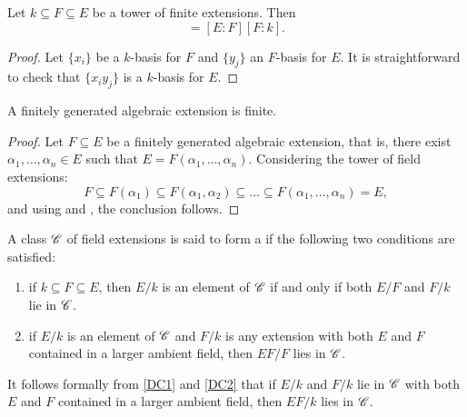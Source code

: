 \begin{proposition}
    Let $k\subseteq F\subseteq E$ be a tower of finite extensions. Then 
    \begin{equation*}
        [E : k] = [E : F][F : k].
    \end{equation*}
\end{proposition}
\begin{proof}
    Let $\{x_i\}$ be a $k$-basis for $F$ and $\{y_j\}$ an $F$-basis for $E$. It is straightforward to check that $\{x_iy_j\}$ is a $k$-basis for $E$.
\end{proof}

\begin{corollary}
    A finitely generated algebraic extension is finite.
\end{corollary}
\begin{proof}
    Let $F\subseteq E$ be a finitely generated algebraic extension, that is, there exist $\alpha_1,\dots,\alpha_n\in E$ such that $E = F(\alpha_1,\dots,\alpha_n)$. Considering the tower of field extensions: 
    \begin{equation*}
        F\subseteq F(\alpha_1)\subseteq F(\alpha_1, \alpha_2)\subseteq\dots\subseteq F(\alpha_1,\dots,\alpha_n) = E,
    \end{equation*}
    and using  and , the conclusion follows.
\end{proof}

\begin{definition}
    A class $\mathscr{C}$ of field extensions is said to form a  if the following two conditions are satisfied: 
    \begin{enumerate}[label=(DC \arabic*)]
        \item if $k\subseteq F\subseteq E$, then $E/k$ is an element of $\mathscr{C}$ if and only if both $E/F$ and $F/k$ lie in $\mathscr{C}$. \label{DC1}
        \item if $E/k$ is an element of $\mathscr{C}$ and $F/k$ is any extension with both $E$ and $F$ contained in a larger ambient field, then $EF/F$ lies in $\mathscr{C}$. \label{DC2}
    \end{enumerate}
\end{definition}

\begin{remark}
    It follows formally from \ref{DC1} and \ref{DC2} that if $E/k$ and $F/k$ lie in $\mathscr{C}$ with both $E$ and $F$ contained in a larger ambient field, then $EF/k$ lies in $\mathscr{C}$.
\end{remark}


